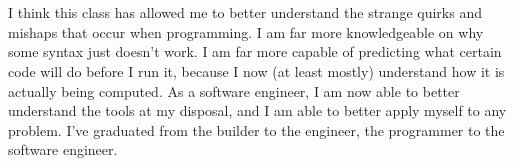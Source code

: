 \documentclass{article}
\theoremstyle{theorem}
\theoremstyle{definition}
\theoremstyle{remark}
\begin{document}
\\\\
I think this class has allowed me to better understand the strange quirks and mishaps that occur when programming. I am far more knowledgeable on why some syntax just doesn’t work. I am far more capable of predicting what certain code will do before I run it, because I now (at least mostly) understand how it is actually being computed. As a software engineer, I am now able to better understand the tools at my disposal, and I am able to better apply myself to any problem. I’ve graduated from the builder to the engineer, the programmer to the software engineer.





\medskip

\printbibliography


\cite{noauthor_cfi_nodate}
\cite{noauthor_guide_nodate}
\cite{godbolt_compiler_nodate}
\cite{john_e._introduction_nodate}
\cite{noauthor_assembly_nodate}
\cite{noauthor_macos_nodate}
\cite{noauthor_x86_nodate-1}
\cite{noauthor_x86_nodate}
\end{document}

